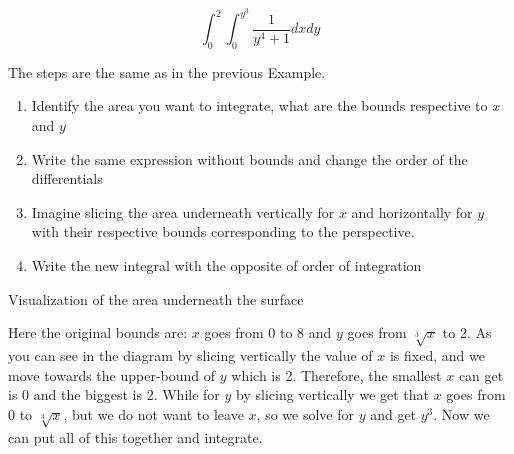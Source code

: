 \[\int_{0}^{2}\int_{0}^{y^3} \frac{1}{y^4 +1}dx dy\]

The steps are the same as in the previous Example.

\begin{enumerate}
    \item Identify the area you want to integrate, what are the bounds respective to \(x\) and \(y\)
    \item Write the same expression without bounds and change the order of the differentials
    \item Imagine slicing the area underneath vertically for \(x\) and horizontally for \(y\) with their respective bounds corresponding
    to the perspective.
    \item Write the new integral with the opposite of order of integration
\end{enumerate}

\begin{center}

    Visualization of the area underneath the surface
    \smallskip

\end{center}

Here the original bounds are: \(x\) goes from 0 to 8 and \(y\) goes from \(\sqrt[3]{x}\) to 2.
As you can see in the diagram by slicing vertically the value of \(x\) is fixed, and we move 
towards the upper-bound of \(y\) which is 2.
Therefore, the smallest \(x\) can get is 0 and the biggest is 2. While for \(y\) by slicing 
vertically we get that \(x\) goes from 0 to \(\sqrt[3]{x}\), but 
we do not want to leave \(x\), so we solve for \(y\) and get \(y^3\). 
Now we can put all of this together and integrate.


